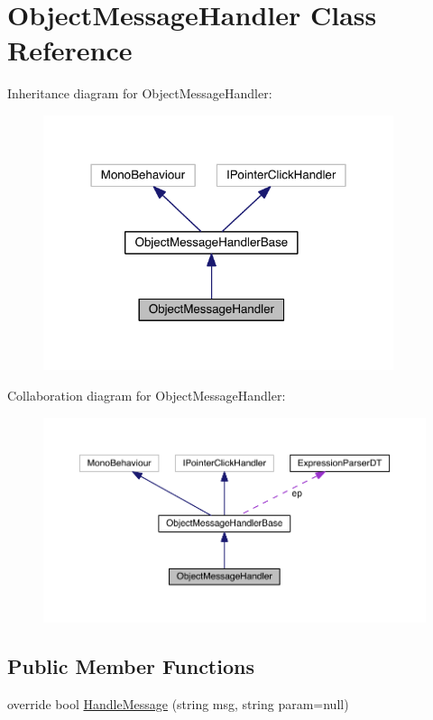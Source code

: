 \hypertarget{class_object_message_handler}{}\section{Object\+Message\+Handler Class Reference}
\label{class_object_message_handler}


Inheritance diagram for Object\+Message\+Handler\+:\nopagebreak
\begin{figure}[H]
\begin{center}
\leavevmode
\includegraphics[width=291pt]{class_object_message_handler__inherit__graph}
\end{center}
\end{figure}


Collaboration diagram for Object\+Message\+Handler\+:\nopagebreak
\begin{figure}[H]
\begin{center}
\leavevmode
\includegraphics[width=350pt]{class_object_message_handler__coll__graph}
\end{center}
\end{figure}
\subsection*{Public Member Functions}
\begin{DoxyCompactItemize}
\item 
override bool \hyperlink{class_object_message_handler_ae72846a48ca851170d68bef2ca496f07}{Handle\+Message} (string msg, string param=null)
\end{DoxyCompactItemize}
